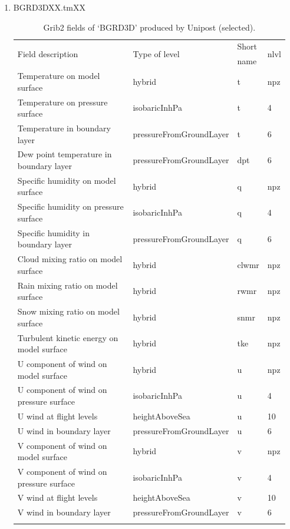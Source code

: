 \documentclass[11pt,fleqn]{report}              %
\begin{document}
\begin{enumerate}
\begin{enumerate}
\begin{itemize}
\begin{enumerate}
\item BGRD3DXX.tmXX
{
\fontsize{10}{12}\selectfont
\begin{longtable}{p{0.5\linewidth} | p{0.31\linewidth} | p{0.09\linewidth} | p{0.06\linewidth} }
\hline
\hline
 \multirow{2}{*}{Field description} & \multirow{2}{*}{Type of level} & Short &  \multirow{2}{*}{nlvl}  \\
  & & name &  \\
\hline
 Temperature on model surface & hybrid & t & npz  \\
 Temperature on pressure surface & isobaricInhPa & t & 4 \\
 Temperature in boundary layer & pressureFromGroundLayer & t & 6 \\
 Dew point temperature in boundary layer & pressureFromGroundLayer & dpt & 6 \\
 Specific humidity on model surface & hybrid & q & npz  \\
 Specific humidity on pressure surface & isobaricInhPa & q & 4  \\
 Specific humidity in boundary layer & pressureFromGroundLayer & q & 6 \\
 Cloud mixing ratio on model surface & hybrid & clwmr & npz \\
 Rain mixing ratio on model surface & hybrid & rwmr & npz \\
 Snow mixing ratio on model surface & hybrid & snmr & npz \\
 Turbulent kinetic energy on model surface & hybrid & tke & npz \\
 U component of wind on model surface & hybrid & u & npz \\
 U component of wind on pressure surface & isobaricInhPa & u & 4 \\
 U wind at flight levels & heightAboveSea & u & 10 \\
 U wind in boundary layer & pressureFromGroundLayer & u & 6 \\
 V component of wind on model surface & hybrid & v & npz \\
 V component of wind on pressure surface & isobaricInhPa & v & 4 \\
 V wind at flight levels & heightAboveSea & v & 10 \\
 V wind in boundary layer & pressureFromGroundLayer & v & 6 \\
\hline
\caption{Grib2 fields of `BGRD3D' produced by Unipost (selected).}
\label{table:fv3_grb2_lev_table}
\end{longtable}
}


\end{enumerate}
\end{itemize}
\end{enumerate}
\end{enumerate}
\end{document}
